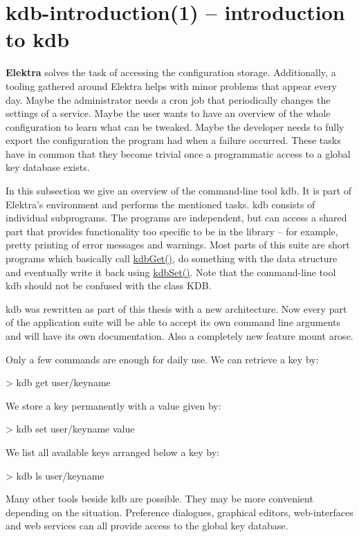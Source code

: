 \section*{kdb-\/introduction(1) -- introduction to kdb }

{\bfseries Elektra} solves the task of accessing the configuration storage. Additionally, a tooling gathered around Elektra helps with minor problems that appear every day. Maybe the administrator needs a cron job that periodically changes the settings of a service. Maybe the user wants to have an overview of the whole configuration to learn what can be tweaked. Maybe the developer needs to fully export the configuration the program had when a failure occurred. These tasks have in common that they become trivial once a programmatic access to a global key database exists.

In this subsection we give an overview of the command-\/line tool {\ttfamily kdb}. It is part of Elektra's environment and performs the mentioned tasks. {\ttfamily kdb} consists of individual subprograms. The programs are independent, but can access a shared part that provides functionality too specific to be in the library -- for example, pretty printing of error messages and warnings. Most parts of this suite are short programs which basically call {\ttfamily \hyperlink{group__kdb_ga28e385fd9cb7ccfe0b2f1ed2f62453a1}{kdb\+Get()}}, do something with the data structure and eventually write it back using {\ttfamily \hyperlink{group__kdb_ga11436b058408f83d303ca5e996832bcf}{kdb\+Set()}}. Note that the command-\/line tool {\ttfamily kdb} should not be confused with the class {\ttfamily K\+D\+B}.

{\ttfamily kdb} was rewritten as part of this thesis with a new architecture. Now every part of the application suite will be able to accept its own command line arguments and will have its own documentation. Also a completely new feature {\ttfamily mount} arose.

Only a few commands are enough for daily use. We can retrieve a key by\+: \begin{DoxyVerb}    > kdb get user/keyname
\end{DoxyVerb}


We store a key permanently with a value given by\+: \begin{DoxyVerb}    > kdb set user/keyname value
\end{DoxyVerb}


We list all available keys arranged below a key by\+: \begin{DoxyVerb}    > kdb ls user/keyname
\end{DoxyVerb}


Many other tools beside {\ttfamily kdb} are possible. They may be more convenient depending on the situation. Preference dialogues, graphical editors, web-\/interfaces and web services can all provide access to the global key database. 